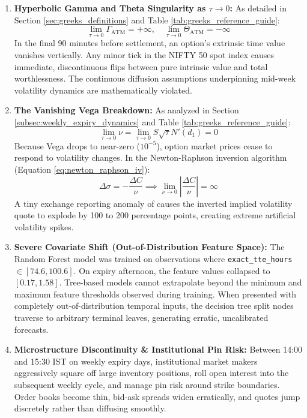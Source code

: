 \begin{enumerate}
    \item \textbf{Hyperbolic Gamma and Theta Singularity as $\tau \to 0$:}
    As detailed in Section \ref{sec:greeks_definitions} and Table \ref{tab:greeks_reference_guide}:
    \begin{equation}
        \lim_{\tau \to 0} \Gamma_{\text{ATM}} = +\infty, \quad \lim_{\tau \to 0} \Theta_{\text{ATM}} = -\infty
    \end{equation}
    In the final 90 minutes before settlement, an option's extrinsic time value vanishes vertically. Any minor tick in the NIFTY 50 spot index causes immediate, discontinuous flips between pure intrinsic value and total worthlessness. The continuous diffusion assumptions underpinning mid-week volatility dynamics are mathematically violated.

    \item \textbf{The Vanishing Vega Breakdown:}
    As analyzed in Section \ref{subsec:weekly_expiry_dynamics} and Table \ref{tab:greeks_reference_guide}:
    \begin{equation}
        \lim_{\tau \to 0} \nu = \lim_{\tau \to 0} S \sqrt{\tau} N'(d_1) = 0
    \end{equation}
    Because Vega drops to near-zero ($10^{-5}$), option market prices cease to respond to volatility changes. In the Newton-Raphson inversion algorithm (Equation \eqref{eq:newton_raphson_iv}):
    \begin{equation}
        \Delta \sigma = -\frac{\Delta C}{\nu} \implies \lim_{\nu \to 0} \left| \frac{\Delta C}{\nu} \right| = \infty
    \end{equation}
    A tiny exchange reporting anomaly of  causes the inverted implied volatility quote to explode by 100 to 200 percentage points, creating extreme artificial volatility spikes.

    \item \textbf{Severe Covariate Shift (Out-of-Distribution Feature Space):}
    The Random Forest model was trained on observations where \texttt{exact\_tte\_hours} $\in [74.6, 100.6]$. On expiry afternoon, the feature values collapsed to $[0.17, 1.58]$. Tree-based models cannot extrapolate beyond the minimum and maximum feature thresholds observed during training. When presented with completely out-of-distribution temporal inputs, the decision tree split nodes traverse to arbitrary terminal leaves, generating erratic, uncalibrated forecasts.

    \item \textbf{Microstructure Discontinuity \& Institutional Pin Risk:}
    Between 14:00 and 15:30 IST on weekly expiry days, institutional market makers aggressively square off large inventory positions, roll open interest into the subsequent weekly cycle, and manage pin risk around strike boundaries. Order books become thin, bid-ask spreads widen erratically, and quotes jump discretely rather than diffusing smoothly.
\end{enumerate}

